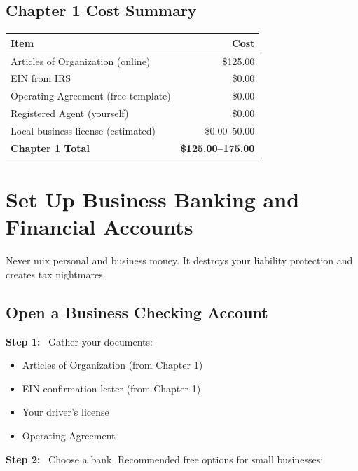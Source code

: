 \documentclass[12pt, letterpaper, oneside]{book}
\newcommand{\step}[1]{\noindent\textbf{\textcolor{primary}{Step #1:}}~}
\begin{document}
\section{Chapter 1 Cost Summary}

\begin{table}[H]
\centering
\begin{tabular}{lr}
\toprule
\textbf{Item} & \textbf{Cost} \\
\midrule
Articles of Organization (online) & \$125.00 \\
EIN from IRS & \$0.00 \\
Operating Agreement (free template) & \$0.00 \\
Registered Agent (yourself) & \$0.00 \\
Local business license (estimated) & \$0.00--50.00 \\
\midrule
\textbf{Chapter 1 Total} & \textbf{\$125.00--175.00} \\
\bottomrule
\end{tabular}
\end{table}


\chapter{Set Up Business Banking and Financial Accounts}

Never mix personal and business money. It destroys your liability protection and creates tax nightmares.

\section{Open a Business Checking Account}

\step{1} Gather your documents:
\begin{itemize}[leftmargin=2em]
  \item Articles of Organization (from Chapter 1)
  \item EIN confirmation letter (from Chapter 1)
  \item Your driver's license
  \item Operating Agreement
\end{itemize}

\step{2} Choose a bank. Recommended free options for small businesses:
\end{document}
